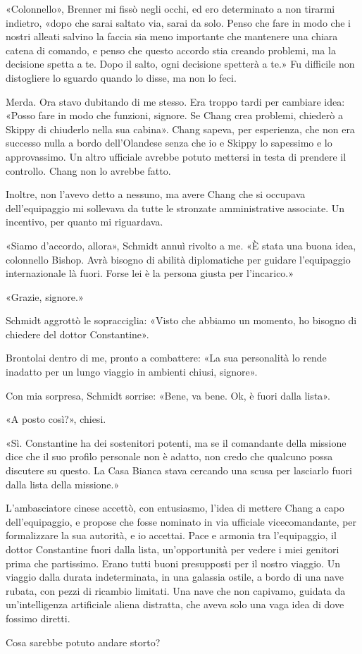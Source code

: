 «Colonnello», Brenner mi fissò negli occhi, ed ero determinato a non
tirarmi indietro, «dopo che sarai saltato via, sarai da solo. Penso che
fare in modo che i nostri alleati salvino la faccia sia meno importante
che mantenere una chiara catena di comando, e penso che questo accordo
stia creando problemi, ma la decisione spetta a te. Dopo il salto, ogni
decisione spetterà a te.» Fu difficile non distogliere lo sguardo quando
lo disse, ma non lo feci.

Merda. Ora stavo dubitando di me stesso. Era troppo tardi per cambiare
idea: «Posso fare in modo che funzioni, signore. Se Chang crea problemi,
chiederò a Skippy di chiuderlo nella sua cabina». Chang sapeva, per
esperienza, che non era successo nulla a bordo dell'Olandese senza che
io e Skippy lo sapessimo e lo approvassimo. Un altro ufficiale avrebbe
potuto mettersi in testa di prendere il controllo. Chang non lo avrebbe
fatto.

Inoltre, non l'avevo detto a nessuno, ma avere Chang che si occupava
dell'equipaggio mi sollevava da tutte le stronzate amministrative
associate. Un incentivo, per quanto mi riguardava.

«Siamo d'accordo, allora», Schmidt annuì rivolto a me. «È stata una
buona idea, colonnello Bishop. Avrà bisogno di abilità diplomatiche per
guidare l'equipaggio internazionale là fuori. Forse lei è la persona
giusta per l'incarico.»

«Grazie, signore.»

Schmidt aggrottò le sopracciglia: «Visto che abbiamo un momento, ho
bisogno di chiedere del dottor Constantine».

Brontolai dentro di me, pronto a combattere: «La sua personalità lo
rende inadatto per un lungo viaggio in ambienti chiusi, signore».

Con mia sorpresa, Schmidt sorrise: «Bene, va bene. Ok, è fuori dalla
lista».

«A posto così?», chiesi.

«Sì. Constantine ha dei sostenitori potenti, ma se il comandante della
missione dice che il suo profilo personale non è adatto, non credo che
qualcuno possa discutere su questo. La Casa Bianca stava cercando una
scusa per lasciarlo fuori dalla lista della missione.»

L'ambasciatore cinese accettò, con entusiasmo, l'idea di mettere Chang a
capo dell'equipaggio, e propose che fosse nominato in via ufficiale
vicecomandante, per formalizzare la sua autorità, e io accettai. Pace e
armonia tra l'equipaggio, il dottor Constantine fuori dalla lista,
un'opportunità per vedere i miei genitori prima che partissimo. Erano
tutti buoni presupposti per il nostro viaggio. Un viaggio dalla durata
indeterminata, in una galassia ostile, a bordo di una nave rubata, con
pezzi di ricambio limitati. Una nave che non capivamo, guidata da
un'intelligenza artificiale aliena distratta, che aveva solo una vaga
idea di dove fossimo diretti.

Cosa sarebbe potuto andare storto?